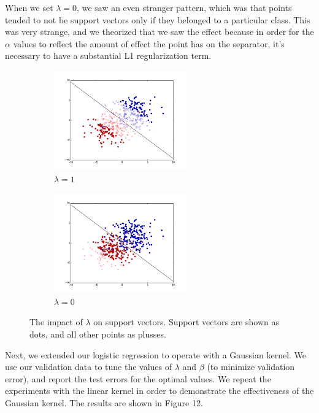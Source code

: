 \documentclass{sigchi}
\begin{document}
When we set $\lambda = 0$, we saw an even stranger pattern, which was that points tended to not be support vectors only if they belonged to a particular class. This was very strange, and we theorized that we saw the effect because in order for the $\alpha$ values to reflect the amount of effect the point has on the separator, it's necessary to have a substantial L1 regularization term.

\begin{figure}
\centering

\begin{subfigure}[b]{2.25in}
	\includegraphics[width = 2.25in]{plots/stdev2_test_plot_lambda_sup_vectors.png}
	\caption{$\lambda = 1$}
\end{subfigure}

\begin{subfigure}[b]{2.25in}
	\includegraphics[width = 2.25in]{plots/stdev2_test_plot_lambda_0_supvec.png}
	\caption{$\lambda = 0$}
\end{subfigure}
\caption{The impact of $\lambda$ on support vectors. Support vectors are shown as dots, and all other points as plusses.}
\end{figure}

Next, we extended our logistic regression to operate with a Gaussian kernel. We use our validation data to tune the values of $\lambda$ and $\beta$ (to minimize validation error), and report the test errors for the optimal values. We repeat the experiments with the linear kernel in order to demonstrate the effectiveness of the Gaussian kernel. The results are shown in Figure 12.
\end{document}
